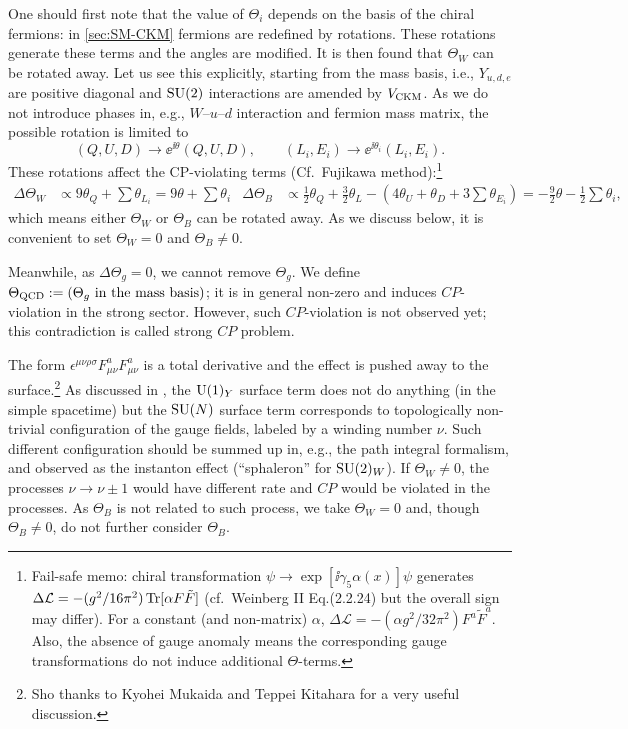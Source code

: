 \documentclass[CheatSheet]{subfiles}
\begin{document}
One should first note that the value of $\Theta_i$ depends on the basis of the chiral fermions: in \cref{sec:SM-CKM} fermions are redefined by rotations. These rotations generate these terms and the angles are modified.
It is then found that $\Theta_W$ can be rotated away.
Let us see this explicitly, starting from the mass basis, i.e., $Y_{u,d,e}$ are positive diagonal and $\operatorname{\mathrm SU}(2)$ interactions are amended by $V_{\mathrm{CKM}}$.
As we do not introduce phases in, e.g., $W$--$u$--$d$ interaction and fermion mass matrix, the possible rotation is limited to
\begin{equation}
 (Q,U,D)\to\ee^{\ii\theta}(Q,U,D), \qquad
 (L_i, E_i)\to\ee^{\ii\theta_i}(L_i,E_i).
\end{equation}
These rotations affect the CP-violating terms (Cf.~Fujikawa method):\footnote{%
Fail-safe memo:
chiral transformation $\psi\to\exp[\ii\gamma_5\alpha(x)]\psi$ generates
$\Delta\mathcal L = -(g^2/16\pi^2)\operatorname{\mathrm{Tr}}[\alpha F\tilde F]$ (cf.~Weinberg II Eq.(2.2.24) but the overall sign may differ). For a constant (and non-matrix) $\alpha$, 
$\Delta\mathcal L = -(\alpha g^2/32\pi^2)F^a\tilde F^a$.
Also, the absence of gauge anomaly means the corresponding gauge transformations do not induce additional $\Theta$-terms.
}
\begin{align}
 \Delta \Theta_W &\propto 9\theta_Q + \sum\theta_{L_i} = 9\theta + \sum\theta_i&
 \Delta \Theta_B &\propto \frac12 \theta_Q + \frac32 \theta_L - (4\theta_U+\theta_D+3\sum\theta_{E_i}) = -\frac92 \theta - \frac12 \sum\theta_i,
\end{align}
which means either $\Theta_W$ or $\Theta_B$ can be rotated away.
As we discuss below, it is convenient to set $\Theta_W=0$ and $\Theta_B\neq 0$.

Meanwhile, as $\Delta\Theta_g=0$, we cannot remove $\Theta_g$.
We define $\Theta_{\mathrm{QCD}}:=(\text{$\Theta_g$ in the mass basis})$; it is in general non-zero and induces $CP$-violation in the strong sector.
However, such $CP$-violation is not observed yet; this contradiction is called strong $CP$ problem.

The form $\epsilon^{\mu\nu\rho\sigma}F^a_{\mu\nu}F^a_{\mu\nu}$ is a total derivative and the effect is pushed away to the surface.\footnote{%
  Sho thanks to Kyohei Mukaida and Teppei Kitahara for a very useful discussion.
}
As discussed in \cite[\S23]{WeinbergQFT2}, the $\operatorname{\mathrm U}(1)_Y$ surface term does not do anything (in the simple spacetime) but the $\operatorname{\mathrm SU}(N)$ surface term corresponds to topologically non-trivial configuration of the gauge fields, labeled by a winding number $\nu$.
Such different configuration should be summed up in, e.g., the path integral formalism, and observed as the instanton effect (``sphaleron'' for $\operatorname{\mathrm SU}(2)_W$).
If $\Theta_W\neq 0$, the processes $\nu\to\nu\pm1$ would have different rate and $CP$ would be violated in the processes.
As $\Theta_B$ is not related to such process, we take $\Theta_W=0$ and, though $\Theta_B\neq 0$, do not further consider $\Theta_B$.
\end{document}
